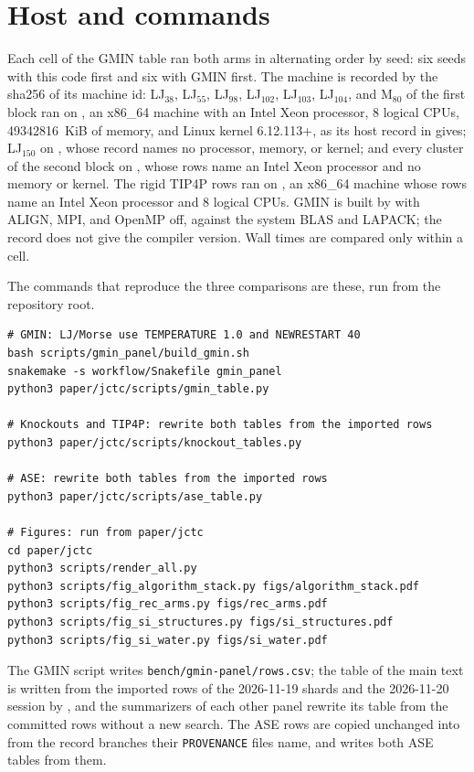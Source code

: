 \documentclass[journal=jctcce,manuscript=suppinfo]{achemso}
\begin{document}
\section{Host and commands}
\label{sec:host}
Each cell of the GMIN table ran both arms in alternating order by seed:
six seeds with this code first and six with GMIN first.
The machine is recorded by the sha256 of its machine id: LJ\(_{38}\),
LJ\(_{55}\), LJ\(_{98}\), LJ\(_{102}\), LJ\(_{103}\),
LJ\(_{104}\), and M\(_{80}\) of the first block ran on
\texttt{},
an x86\_64 machine with an Intel Xeon processor, 8 logical CPUs, 49342816~KiB
of memory, and Linux kernel 6.12.113+, as its host record in
 gives;
LJ\(_{150}\) on
\texttt{},
whose record names no processor, memory, or kernel;
and every cluster of the second block on
\texttt{},
whose rows name an Intel Xeon processor and no memory or kernel.
The rigid TIP4P rows ran on
\texttt{},
an x86\_64 machine whose rows name an Intel Xeon processor and 8 logical
CPUs.
GMIN is built by  with ALIGN, MPI,
and OpenMP off, against the system BLAS and LAPACK; the record does not
give the compiler version.
Wall times are compared only within a cell.

The commands that reproduce the three comparisons are these, run from the
repository root.
\begin{footnotesize}
\begin{verbatim}
# GMIN: LJ/Morse use TEMPERATURE 1.0 and NEWRESTART 40
bash scripts/gmin_panel/build_gmin.sh
snakemake -s workflow/Snakefile gmin_panel
python3 paper/jctc/scripts/gmin_table.py

# Knockouts and TIP4P: rewrite both tables from the imported rows
python3 paper/jctc/scripts/knockout_tables.py

# ASE: rewrite both tables from the imported rows
python3 paper/jctc/scripts/ase_table.py

# Figures: run from paper/jctc
cd paper/jctc
python3 scripts/render_all.py
python3 scripts/fig_algorithm_stack.py figs/algorithm_stack.pdf
python3 scripts/fig_rec_arms.py figs/rec_arms.pdf
python3 scripts/fig_si_structures.py figs/si_structures.pdf
python3 scripts/fig_si_water.py figs/si_water.pdf
\end{verbatim}
\end{footnotesize}
The GMIN script writes \texttt{bench/gmin-panel/rows.csv}; the table of the main
text is written from the imported rows of the 2026-11-19 shards and the
2026-11-20 session by
, and the summarizers of each other panel
rewrite its table from the committed rows without a new search.
The ASE rows are copied unchanged into 
from the record branches their \texttt{PROVENANCE} files name, and
 writes both ASE tables from them.
\end{document}
